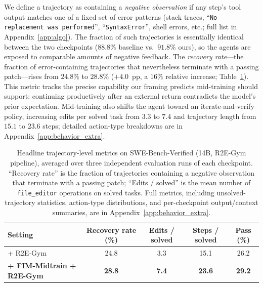 We define a trajectory as containing a \emph{negative observation} if any
step's tool output matches one of a fixed set of error patterns (stack
traces, ``\texttt{No replacement was performed}'', ``\texttt{SyntaxError}'',
shell errors, etc.; full list in Appendix~\ref{app:algo}). The fraction
of such trajectories is essentially identical between the two checkpoints
($88.8\%$ baseline vs.\ $91.8\%$ ours), so the agents are exposed to
comparable amounts of negative feedback. The \emph{recovery rate}---the
fraction of error-containing trajectories that nevertheless terminate
with a passing patch---rises from $24.8\%$ to $28.8\%$ ($+4.0$~pp, a
$16\%$ relative increase; Table~\ref{tab:behavior_main}). This metric
tracks the precise capability our framing predicts mid-training should
support: continuing productively after an external return contradicts
the model's prior expectation. Mid-training also shifts the agent toward
an iterate-and-verify policy, increasing edits per solved task from
$3.3$ to $7.4$ and trajectory length from $15.1$ to $23.6$ steps;
detailed action-type breakdowns are in
Appendix~\ref{app:behavior_extra}.

\begin{table}[h]
\centering
\caption{Headline trajectory-level metrics on SWE-Bench-Verified (14B,
R2E-Gym pipeline), averaged over three independent evaluation runs of
each checkpoint. ``Recovery rate'' is the fraction of trajectories
containing a negative observation that terminate with a passing patch;
``Edits / solved'' is the mean number of \texttt{file\_editor}
operations on solved tasks. Full metrics, including unsolved-trajectory
statistics, action-type distributions, and per-checkpoint output/context
summaries, are in Appendix~\ref{app:behavior_extra}.}
\label{tab:behavior_main}
\small
\setlength{\tabcolsep}{8pt}
\begin{tabular}{lcccc}
\toprule
Setting & Recovery rate (\%) & Edits / solved & Steps / solved & Pass (\%) \\
\midrule
+ R2E-Gym                          & 24.8           & 3.3           & 15.1           & 26.2 \\
\textbf{+ FIM-Midtrain + R2E-Gym}  & \textbf{28.8}  & \textbf{7.4}  & \textbf{23.6}  & \textbf{29.2} \\
\bottomrule
\end{tabular}
\end{table}

